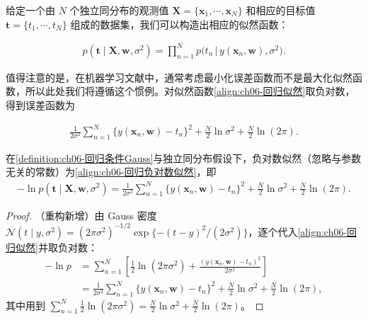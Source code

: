 \documentclass[../../main.tex]{subfiles}
\begin{document}
给定一个由 $N$ 个独立同分布的观测值 $\boldsymbol{X}=\{\boldsymbol{x}_1,\cdots,\boldsymbol{x}_N\}$ 和相应的目标值 $\boldsymbol{t}=\{t_1,\cdots,t_N\}$ 组成的数据集，我们可以构造出相应的似然函数：

\begin{align}
p(\boldsymbol{t}\mid\boldsymbol{X},\boldsymbol{w},\sigma^{2})=\prod_{n=1}^{N}p\bigl(t_n\,\big|\,y(\boldsymbol{x}_n,\boldsymbol{w}),\sigma^{2}\bigr).
\label{align:ch06-回归似然}
\end{align}

值得注意的是，在机器学习文献中，通常考虑最小化误差函数而不是最大化似然函数，所以此处我们将遵循这个惯例。对似然函数\eqref{align:ch06-回归似然}取负对数，得到误差函数为

\begin{align}
\frac{1}{2\sigma^{2}}\sum_{n=1}^{N}\bigl\{y(\boldsymbol{x}_n,\boldsymbol{w})-t_n\bigr\}^{2}+\frac{N}{2}\ln\sigma^{2}+\frac{N}{2}\ln(2\pi).
\label{align:ch06-回归负对数似然}
\end{align}

\begin{proposition}[回归的负对数似然]\label{proposition:ch06-回归负对数似然}
在\cref{definition:ch06-回归条件Gauss}与独立同分布假设下，负对数似然（忽略与参数无关的常数）为\eqref{align:ch06-回归负对数似然}，即
\begin{align}
-\ln p(\boldsymbol{t}\mid\boldsymbol{X},\boldsymbol{w},\sigma^{2})
=\frac{1}{2\sigma^{2}}\sum_{n=1}^{N}\bigl\{y(\boldsymbol{x}_n,\boldsymbol{w})-t_n\bigr\}^{2}+\frac{N}{2}\ln\sigma^{2}+\frac{N}{2}\ln(2\pi).
\label{align:ch06-回归负对数展开}
\end{align}
\end{proposition}

\begin{proof}
（重构新增）由 Gauss 密度 $\mathcal{N}(t\mid y,\sigma^{2})=(2\pi\sigma^{2})^{-1/2}\exp\{-(t-y)^{2}/(2\sigma^{2})\}$，逐个代入\eqref{align:ch06-回归似然}并取负对数：
\begin{align}
-\ln p&=\sum_{n=1}^{N}\left[\frac{1}{2}\ln(2\pi\sigma^{2})+\frac{(y(\boldsymbol{x}_n,\boldsymbol{w})-t_n)^{2}}{2\sigma^{2}}\right]\nonumber\\
&=\frac{1}{2\sigma^{2}}\sum_{n=1}^{N}\bigl\{y(\boldsymbol{x}_n,\boldsymbol{w})-t_n\bigr\}^{2}+\frac{N}{2}\ln\sigma^{2}+\frac{N}{2}\ln(2\pi),
\end{align}
其中用到 $\sum_{n=1}^{N}\frac{1}{2}\ln(2\pi\sigma^{2})=\frac{N}{2}\ln\sigma^{2}+\frac{N}{2}\ln(2\pi)$。
\end{proof}
\end{document}
